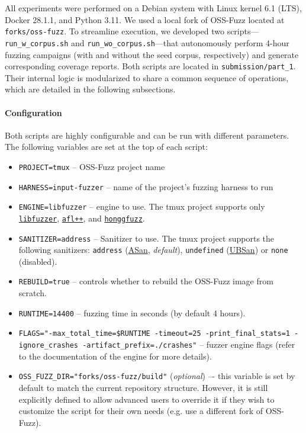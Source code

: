 All experiments were performed on a Debian system with Linux kernel 6.1 (LTS),
Docker 28.1.1, and Python 3.11. We used a local fork of OSS-Fuzz located at
\texttt{forks/oss-fuzz}. To streamline execution, we developed two
scripts---\texttt{run\_w\_corpus.sh} and \texttt{run\_wo\_corpus.sh}---that
autonomously perform 4-hour fuzzing campaigns (with and without the seed corpus,
respectively) and generate corresponding coverage reports. Both scripts are
located in \texttt{submission/part\_1}. Their internal logic is modularized to
share a common sequence of operations, which are detailed in the following
subsections.

\noindent \paragraph{Configuration} \label{sec:methodology_configuration} Both scripts are highly configurable and can be run with different parameters. The following variables are set at the top of each script:
\begin{itemize}
	\item \texttt{PROJECT=tmux} -- OSS-Fuzz project name
	\item \texttt{HARNESS=input-fuzzer} -- name of the project's fuzzing harness to run
	\item \texttt{ENGINE=libfuzzer} -- engine to use.
	      The tmux project supports only
	      \href{https://llvm.org/docs/LibFuzzer.html}{\texttt{libfuzzer}},
	      \href{https://aflplus.plus/}{\texttt{afl++}}, and
	      \href{https://honggfuzz.dev/}{\texttt{honggfuzz}}.
	      \cite{oss-fuzz:tmux_project_yaml}
	\item \texttt{SANITIZER=address} -- Sanitizer to use. The tmux project supports the following sanitizers:
	      \texttt{address} (\href{https://clang.llvm.org/docs/AddressSanitizer.html}{ASan}, \emph{default}),
	      \texttt{undefined} (\href{https://clang.llvm.org/docs/UndefinedBehaviorSanitizer.html}{UBSan}) or
	      \texttt{none} (disabled).
	      \cite{oss-fuzz:tmux_project_yaml}
	\item \texttt{REBUILD=true} -- controls whether to rebuild the OSS-Fuzz image from scratch.
	\item \texttt{RUNTIME=14400} -- fuzzing time in seconds (by default 4 hours).
	\item \texttt{FLAGS="-max\_total\_time=\$RUNTIME -timeout=25 -print\_final\_stats=1 -ignore\_crashes -artifact\_prefix=./crashes"} -- fuzzer engine flags (refer to the documentation of the engine for more details).
	\item \texttt{OSS\_FUZZ\_DIR="forks/oss-fuzz/build"} (\emph{optional}) –- this variable is set by default to match the current repository structure. However, it is still explicitly defined to allow advanced users to override it if they wish to customize the script for their own needs (e.g. use a different fork of OSS-Fuzz).
\end{itemize}

